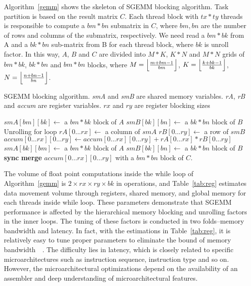 Algorithm~\ref{gemm} shows the skeleton of SGEMM blocking algorithm. Task partition is based on the result matrix $C$. Each thread block with $tx*ty$ threads is responsible to compute a $bm*bn$ submatrix in $C$, where $bm, bn$ are the number of rows and columns of the submatrix, respectively. We need read a $bm*bk$ from A and a $bk*bn$ sub-matrix from B for each thread block, where $bk$ is unroll factor. In this way, $A$, $B$ and $C$ are divided into $M*K$, $K*N$ and $M*N$ grids of $bm*bk$, $bk*bn$ and $bm*bn$ blocks, where $M=\Bigl\lfloor \frac{m+bm-1}{bm} \Bigr\rfloor$, $K=\Bigl\lfloor \frac{k+bk-1}{bk} \Bigr\rfloor$, $N=\Bigl\lfloor \frac{n+bn-1}{bn} \Bigr\rfloor$.

\begin{algorithm}
  \caption{SGEMM blocking algorithm. {\em smA} and {\em smB} are shared memory variables. {\em rA}, {\em rB} and {\em accum} are register variables. $rx$ and $ry$ are register blocking sizes}
  \label{gemm}
  \begin{algorithmic}[1]
	\State $smA[bm][bk] \gets$ a $bm * bk$ block of $A$
	\State $smB[bk][bn] \gets$ a $bk * bn$ block of $B$
	\Do
	 \Comment Unrolling for loop
	\State $rA[0...rx]\gets$ a column of $smA$
	\State $rB[0...ry]\gets$ a row of $smB$
	\State $accum[0...rx][0...ry]\gets accum[0...rx][0...ry]+rA[0...rx]*rB[0...ry]$
	\EndFor
	\State $smA[bk][bm]\gets$ a $bm*bk$ block of $A$
	\State $smB[bk][bn]\gets$ a $bk*bn$ block of $B$
	\State \textbf{sync}
	\State \textbf{merge} $accum[0...rx][0...ry]$ with a $bm*bn$ block of $C$.
  \end{algorithmic}
\end{algorithm}

The volume of float point computations inside the while loop of Algorithm~\ref{gemm} is $2\times rx\times ry \times bk$ in operations, and Table~\ref{tab:reg} estimates data movement volume through registers, shared memory, and global memory for each threads inside while loop.
These parameters demonstrate that SGEMM performance is affected by the hierarchical memory blocking and unrolling factors in the inner loops.
The tuning of these factors is conducted in two folds--memory bandwidth and latency. In fact, with the estimations in Table~\ref{tab:reg}, it is relatively easy to tune proper parameters to eliminate the bound of memory bandwidth~\cite{magma}~\cite{tan}. The difficulty lies in latency, which is closely related to specific microarchitectures such as instruction sequence, instruction type and so on. However, the microarchitectural optimizations depend on the availability of an assembler and deep understanding of microarchitectural features. %

